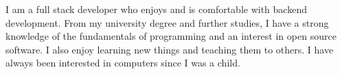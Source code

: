 

\begin{cvparagraph}

I am a full stack developer who enjoys and is comfortable with backend development.
From my university degree and further studies, I have a strong knowledge of the fundamentals of programming and an interest in open source software. 
I also enjoy learning new things and teaching them to others. 
I have always been interested in computers since I was a child.

\end{cvparagraph}
